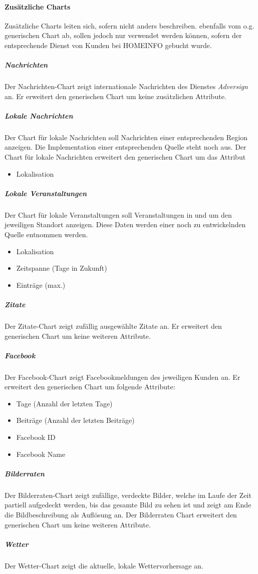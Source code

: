\documentclass[a4paper]{article}
\begin{document}
	\paragraph{Zusätzliche Charts}
	Zusätzliche Charts leiten sich, sofern nicht anders beschreiben. ebenfalls vom o.g. generischen Chart ab, sollen jedoch nur verwendet werden können, sofern der entsprechende Dienst von Kunden bei HOMEINFO gebucht wurde.
	\subparagraph{Nachrichten}
	Der Nachrichten-Chart zeigt internationale Nachrichten des Dienstes \emph{Adversign} an. Er erweitert den generischen Chart um keine zusätzlichen Attribute.
	\subparagraph{Lokale Nachrichten}
	Der Chart für lokale Nachrichten soll Nachrichten einer entsprechenden Region anzeigen. Die Implementation einer entsprechenden Quelle steht noch aus. Der Chart für lokale Nachrichten erweitert den generischen Chart um das Attribut
	\begin{itemize}
	\item Lokalisation
	\end{itemize}
	\subparagraph{Lokale Veranstaltungen}
	Der Chart für lokale Veranstaltungen soll Veranstaltungen in und um den jeweiligen Standort anzeigen. Diese Daten werden einer noch zu entwickelnden Quelle entnommen werden.
	\begin{itemize}
	\item Lokalisation
	\item Zeitspanne (Tage in Zukunft)
	\item Einträge (max.)
	\end{itemize}
	\subparagraph{Zitate}
	Der Zitate-Chart zeigt zufällig ausgewählte Zitate an. Er erweitert den generischen Chart um keine weiteren Attribute.
	\subparagraph{Facebook}
	Der Facebook-Chart zeigt Facebookmeldungen des jeweiligen Kunden an.
	Er erweitert den generischen Chart um folgende Attribute:
	\begin{itemize}
	\item Tage (Anzahl der letzten Tage)
	\item Beiträge (Anzahl der letzten Beiträge)
	\item Facebook ID
	\item Facebook Name
	\end{itemize}
	\subparagraph{Bilderraten}
	Der Bilderraten-Chart zeigt zufällige, verdeckte Bilder, welche im Laufe der Zeit partiell aufgedeckt werden, bis das gesamte Bild zu sehen ist und zeigt am Ende die Bildbeschreibung als Auflösung an.
	Der Bilderraten Chart erweitert den generischen Chart um keine weiteren Attribute.
	\subparagraph{Wetter}
	Der Wetter-Chart zeigt die aktuelle, lokale Wettervorhersage an.
\end{document}
